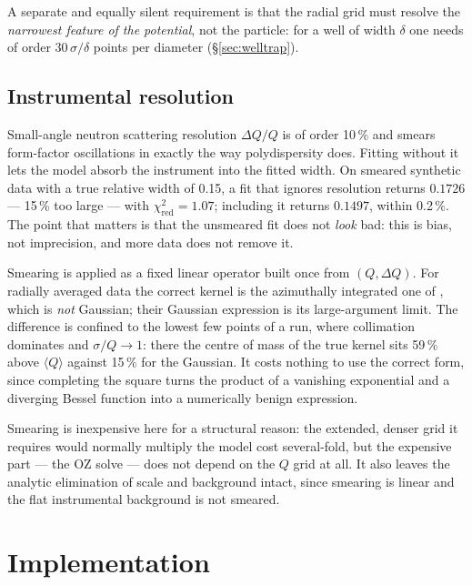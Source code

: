 \documentclass[11pt,a4paper]{article}
\newcommand{\Q}{Q}
\begin{document}
A separate and equally silent requirement is that the radial grid must resolve
the \emph{narrowest feature of the potential}, not the particle: for a well of
width $\delta$ one needs of order $30\,\sigma/\delta$ points per diameter
(\S\ref{sec:welltrap}).

\subsection{Instrumental resolution}
\label{sec:resolution}

Small-angle neutron scattering resolution $\Delta \Q/\Q$ is of order 10\,\% and
smears form-factor oscillations in exactly the way polydispersity does. Fitting
without it lets the model absorb the instrument into the fitted width. On
smeared synthetic data with a true relative width of 0.15, a fit that ignores
resolution returns $0.1726$ --- 15\,\% too large --- with
$\chi^2_{\mathrm{red}} = 1.07$; including it returns $0.1497$, within 0.2\,\%.
The point that matters is that the unsmeared fit does not \emph{look} bad: this
is bias, not imprecision, and more data does not remove it.

Smearing is applied as a fixed linear operator built once from
$(\Q,\Delta \Q)$. For radially averaged data the correct kernel is the
azimuthally integrated one of \citet{Pedersen1990}, which is
\emph{not} Gaussian; their Gaussian expression is its large-argument limit. The
difference is confined to the lowest few points of a run, where collimation
dominates and $\sigma/\Q\to1$: there the centre of mass of the true kernel sits
59\,\% above $\langle \Q\rangle$ against 15\,\% for the Gaussian. It costs
nothing to use the correct form, since completing the square turns the product
of a vanishing exponential and a diverging Bessel function into a numerically
benign expression.

Smearing is inexpensive here for a structural reason: the extended, denser grid
it requires would normally multiply the model cost several-fold, but the
expensive part --- the OZ solve --- does not depend on the $\Q$ grid at all. It
also leaves the analytic elimination of scale and background intact, since
smearing is linear and the flat instrumental background is not smeared.

\section{Implementation}
\end{document}
